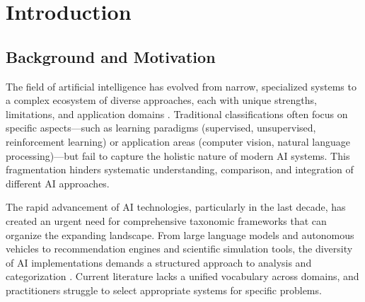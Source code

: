 \documentclass[acmlarge]{acmart}
\begin{document}


\maketitle

\section{Introduction}

\subsection{Background and Motivation}
The field of artificial intelligence has evolved from narrow, specialized systems to a complex ecosystem of diverse approaches, each with unique strengths, limitations, and application domains \cite{arrieta2020explainable, jordan2015machine, russell2021artificial}. Traditional classifications often focus on specific aspects---such as learning paradigms (supervised, unsupervised, reinforcement learning) \cite{bengio2013representation, lecun2015deep} or application areas (computer vision, natural language processing)---but fail to capture the holistic nature of modern AI systems. This fragmentation hinders systematic understanding, comparison, and integration of different AI approaches.

The rapid advancement of AI technologies, particularly in the last decade, has created an urgent need for comprehensive taxonomic frameworks that can organize the expanding landscape. From large language models \cite{bommasani2021opportunities, brown2020language} and autonomous vehicles to recommendation engines and scientific simulation tools, the diversity of AI implementations demands a structured approach to analysis and categorization \cite{goodfellow2016deep}. Current literature lacks a unified vocabulary across domains, and practitioners struggle to select appropriate systems for specific problems.
\end{document}
